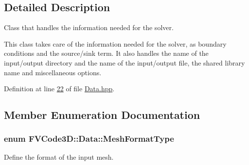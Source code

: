 \subsection{Detailed Description}
Class that handles the information needed for the solver. 

This class takes care of the information needed for the solver, as boundary conditions and the source/sink term. It also handles the name of the input/output directory and the name of the input/output file, the shared library name and miscellaneous options. 

Definition at line \hyperlink{Data_8hpp_source_l00022}{22} of file \hyperlink{Data_8hpp_source}{Data.\+hpp}.



\subsection{Member Enumeration Documentation}
\subsubsection[{\texorpdfstring{Mesh\+Format\+Type}{MeshFormatType}}]{\setlength{\rightskip}{0pt plus 5cm}enum {\bf F\+V\+Code3\+D\+::\+Data\+::\+Mesh\+Format\+Type}}\hypertarget{classFVCode3D_1_1Data_a6a9aa6abc2ca3c85be8578d82a61a9c6}{}\label{classFVCode3D_1_1Data_a6a9aa6abc2ca3c85be8578d82a61a9c6}


Define the format of the input mesh. 

